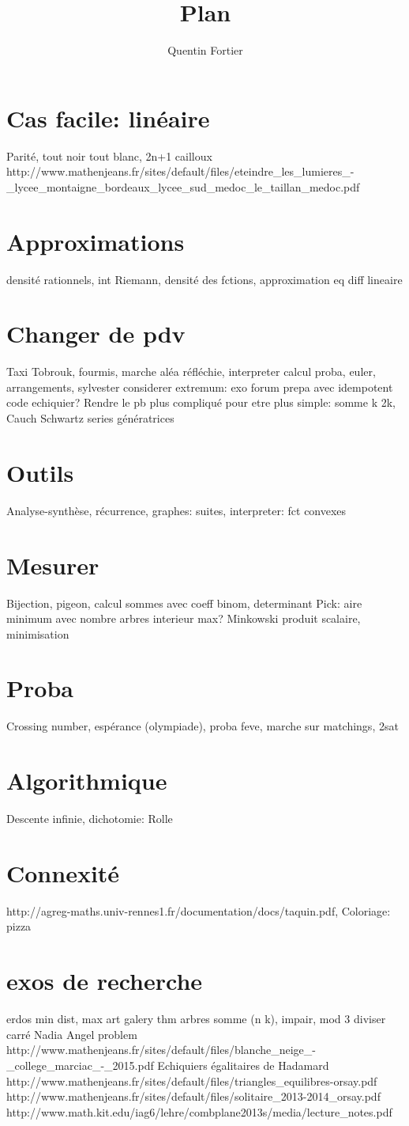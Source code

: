 \documentclass[10pt,a4paper,final]{article}
\author{Quentin Fortier}
\title{Plan}
\begin{document}
\section{Cas facile: linéaire}
Parité, tout noir tout blanc, 2n+1 cailloux
http://www.mathenjeans.fr/sites/default/files/eteindre_les_lumieres_-_lycee_montaigne_bordeaux_lycee_sud_medoc_le_taillan_medoc.pdf
\section{Approximations}
densité rationnels, int Riemann, densité des fctions, approximation eq diff lineaire
\section{Changer de pdv}
Taxi Tobrouk, fourmis, marche aléa réfléchie, interpreter calcul proba, euler, arrangements, sylvester
considerer extremum: exo forum prepa avec idempotent
code echiquier?
Rendre le pb plus compliqué pour etre plus simple: somme k 2k, Cauch Schwartz
series génératrices
\section{Outils}
Analyse-synthèse, récurrence, 
graphes: 
suites, interpreter: fct convexes

\section{Mesurer}
Bijection, pigeon, calcul sommes avec coeff binom, determinant
Pick: aire minimum avec nombre arbres interieur max? 
Minkowski
produit scalaire, minimisation
\section{Proba}
Crossing number, espérance (olympiade), proba feve, marche sur matchings, 2sat
\section{Algorithmique}
Descente infinie, dichotomie: Rolle
\section{Connexité}
http://agreg-maths.univ-rennes1.fr/documentation/docs/taquin.pdf, Coloriage: pizza
\section{exos de recherche}
erdos min dist, max
art galery thm
arbres
somme (n k), impair, mod 3
diviser carré Nadia
Angel problem
http://www.mathenjeans.fr/sites/default/files/blanche_neige_-_college_marciac_-_2015.pdf
Echiquiers égalitaires de Hadamard
http://www.mathenjeans.fr/sites/default/files/triangles_equilibres-orsay.pdf
http://www.mathenjeans.fr/sites/default/files/solitaire_2013-2014_orsay.pdf
http://www.math.kit.edu/iag6/lehre/combplane2013s/media/lecture_notes.pdf
\end{document}
